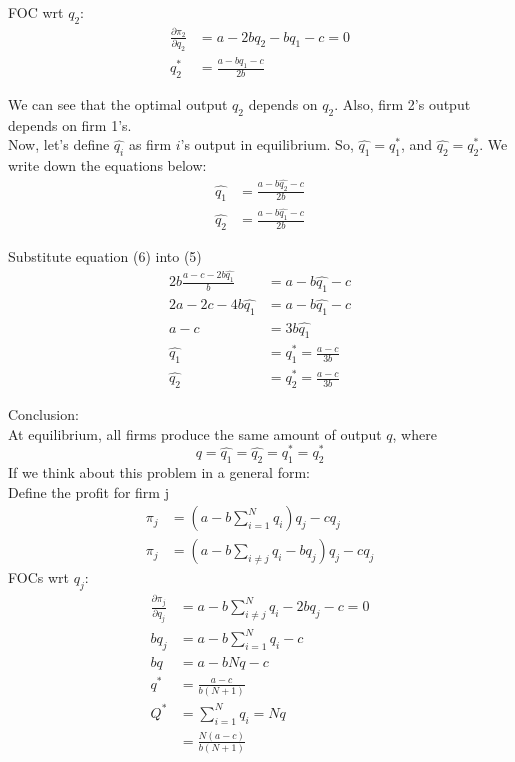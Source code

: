 \documentclass[12pt]{article}
\newcommand{\rr}[1]{^{#1}}
\newcommand{\fp}[2]{\frac{\partial{#1}}{\partial{#2}}}
\newcommand{\addup}[4]{\sum\limits_{#1 = #2} ^#3 {#4}}
\newcommand{\e}[1]{$ #1 $}
\newcommand{\ee}[1]{$$ #1 $$}
\begin{document}
\begin{spacing}{1.5}
            FOC wrt \e{q_2}:
            \begin{align}
                \fp{\pi_2}{q_2} & = a - 2bq_2 - bq_1 -c = 0\\
                q_2\rr* & = \frac{a - bq_1 - c}{2b}
            \end{align}

            We can see that the optimal output \e{q_2} depends on \e{q_2}.
            Also, firm 2's output depends on firm 1's.\\
            Now, let's define \e{\hat{q_i}} as firm \e{i}'s output in equilibrium.
            So, \e{\hat{q_1} = q_1\rr*}, and \e{\hat{q_2} = q_2\rr*}.
            We write down the equations below:
            \begin{align}
                \hat{q_1} & = \frac{a - b\hat{q_2} - c}{2b}\\
                \hat{q_2} & = \frac{a - b\hat{q_1} - c}{2b}
            \end{align}
            
            Substitute equation (6) into (5)
            \begin{align}
                2b\frac{a-c-2b\hat{q_1}}{b} & = a - b\hat{q_1} - c\\
                2a - 2c - 4b\hat{q_1} & = a - b\hat{q_1} - c\\
                a - c & = 3b\hat{q_1}\\
                \hat{q_1} & = q_1\rr* = \frac{a - c}{3b}\\
                \hat{q_2} & = q_2\rr* = \frac{a - c}{3b}
            \end{align}

            Conclusion:\\
            At equilibrium, all firms produce the same amount of output \e{q}, 
            where \ee{q = \hat{q_1} = \hat{q_2} = q_1\rr* = q_2\rr*}
            If we think about this problem in a general form:\\
            Define the profit for firm j
            \begin{align}
                \pi_j & = (a - b\addup{i}{1}{N}{q_i})q_j - cq_j\\
                \pi_j & = (a - b \sum\limits_{i\neq j} q_i - bq_j)q_j - cq_j
            \end{align}
            FOCs wrt \e{q_j}:
            \begin{align}
                \fp{\pi_j}{q_j} & = a - b\sum_{i \neq j}\rr{N} q_i - 2bq_j - c = 0\\
                bq_j & = a - b\addup{i}{1}{N}{q_i} - c\\
                bq & = a - bNq - c\\
                q\rr{*} & = \frac{a - c}{b(N+1)}\\ 
                Q\rr{*} & = \addup{i}{1}{N}{q_i} = Nq\\
                    & = \frac{N(a - c)}{b(N+1)}\\
            \end{align}


\end{spacing}
\end{document}
